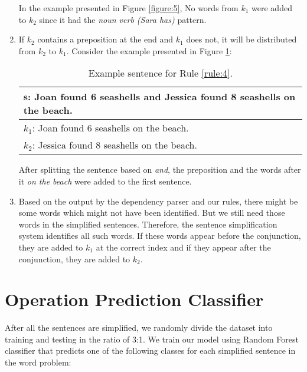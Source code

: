 \documentclass[11pt]{article}
\begin{document}
\begin{enumerate}[topsep=0pt,itemsep=-1ex,partopsep=1ex,parsep=1ex]
In the example presented in Figure \ref{figure:5}, No words from $\mathit{k_{1}}$ were added to $\mathit{k_{2}}$ since it had the \textit{noun verb (Sara has)} pattern.

\item \label{rule:4}
If $\mathit{k_{2}}$ contains a preposition at the end and $\mathit{k_{1}}$ does not, it will be distributed from $\mathit{k_{2}}$ to $\mathit{k_{1}}$. Consider the example presented in Figure \ref{figure:6}:

\begin{table}[h!]
\centering
\begin{tabular}{ | m{7cm} | }
\hline
 $\mathbf{s}$\textbf{: Joan found 6 seashells and Jessica found 8 seashells on the beach.}\\
\hline
$\mathit{k_{1}}$: Joan found 6 seashells on the beach.\\
\hline
$\mathit{k_{2}}$: Jessica found 8 seashells on the beach.\\
\hline
\end{tabular}
\caption{Example sentence for Rule  \ref{rule:4}.}
\label{figure:6}
\end{table}

After splitting the sentence based on \textit{and}, the preposition and the words after it \textit{on the beach} were added to the first sentence.

\item
Based on the output by the dependency parser and our rules, there might be some words which might not have been identified. But we still need those words in the simplified sentences. Therefore, the sentence simplification system identifies all such words. If these words appear before the conjunction, they are added to $\mathit{k_{1}}$ at the correct index and if they appear after the conjunction, they are added to $\mathit{k_{2}}$.

\end{enumerate}

\section{Operation Prediction Classifier}

After all the sentences are simplified, we randomly divide the dataset into training and testing in the ratio of 3:1. We train our model using Random Forest classifier that predicts one of the following classes for each simplified sentence in the word problem:
\end{document}
